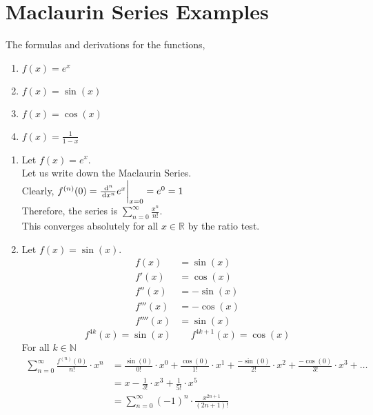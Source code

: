 \documentclass[12pt]{article}
\begin{document}
\section{Maclaurin Series Examples}
\begin{theo}{}
The formulas and derivations for the functions, 
\begin{enumerate}
    \item \(f(x) = e^x\)
    \item \(f(x) = \sin(x)\)
    \item \(f(x) = \cos(x)\)
    \item \(f(x) = \frac{1}{1-x}\)
\end{enumerate}    
\end{theo}
\begin{prf}{}
    \begin{enumerate}
        \item Let \(f(x) = e^x\).\\
        Let us write down the Maclaurin Series.\\
        Clearly, \(f^{(n)}(0) = \frac{\,\mathrm{d}^n}{\,\mathrm{d} x^n}e^x\bigg\vert_{x=0} = e^0 = 1\)\\
        Therefore, the series is \(\displaystyle\sum_{n=0}^\infty \frac{x^n}{n!}\).\\
        This converges absolutely for all \(x\in \mathbb R\) by the ratio test.
        \item Let \(f(x) = \sin(x)\).\\
        \begin{align*}
            f(x) &= \sin(x)\\
            f'(x) &= \cos(x)\\
            f''(x) &= - \sin(x)\\
            f'''(x) &= - \cos(x)\\
            f''''(x) &= \sin(x)
        \end{align*}
        \[f^{4k} (x) = \sin(x) \qquad f^{4k+1}(x) = \cos(x)\]
        For all \(k \in \mathbb{N}\)
        \begin{align*}
            \displaystyle\sum^\infty_{n=0} \frac{f^{(n)}(0)}{n!} \cdot x^n &= \frac{\sin(0)}{0!} \cdot x^0 + \frac{\cos(0)}{1!} \cdot x^1 + \frac{- \sin(0)}{2!} \cdot x^2 + \frac{- \cos(0)}{3!}\cdot x^3 + \dots\\
            &= x - \frac{1}{3!} \cdot x^3 + \frac{1}{5!} \cdot x^5\\
            &= \displaystyle\sum^\infty_{n=0} (-1)^n \cdot \frac{x^{2n+1}}{(2n+1)!}

\end{align*}
\end{enumerate}
\end{prf}
\end{document}
